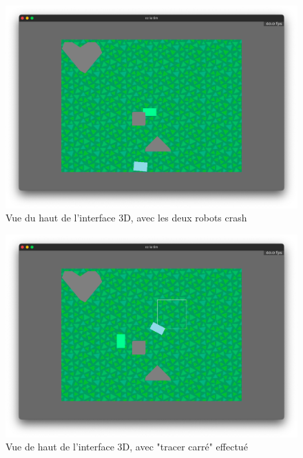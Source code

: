 \documentclass[12pt]{article}
\begin{document}
\begin{center}
\begin{figure}[h]
    \centering
    \includegraphics[width=1\linewidth]{image7.png}
    \caption{Vue du haut de l’interface 3D, avec les deux robots crash}
    \label{fig:enter-label}
\end{figure}



\begin{figure}[p]
    \centering
    \includegraphics[width=1\linewidth]{image4.png}
    \caption{Vue de haut de l’interface 3D, avec "tracer carré" effectué}
    \label{fig:enter-label}
\end{figure}



\end{center}
\end{document}
